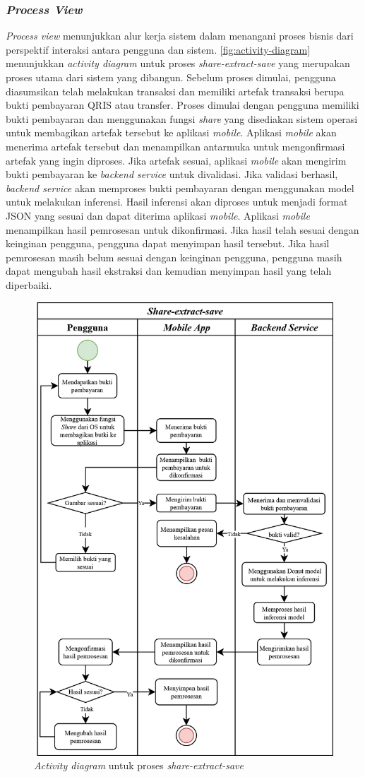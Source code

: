 \subsubsection{\emph{Process View}}
\label{subsubsec:process-view}
\emph{Process view} menunjukkan alur kerja sistem dalam menangani proses bisnis dari perspektif interaksi antara pengguna dan sistem. \autoref{fig:activity-diagram} menunjukkan \emph{activity diagram} untuk proses \emph{share-extract-save} yang merupakan proses utama dari sistem yang dibangun. Sebelum proses dimulai, pengguna diasumsikan telah melakukan transaksi dan memiliki artefak transaksi berupa bukti pembayaran QRIS atau transfer. Proses dimulai dengan pengguna memiliki bukti pembayaran dan menggunakan fungsi \emph{share} yang disediakan sistem operasi untuk membagikan artefak tersebut ke aplikasi \emph{mobile}. Aplikasi \emph{mobile} akan menerima artefak tersebut dan menampilkan antarmuka untuk mengonfirmasi artefak yang ingin diproses. Jika artefak sesuai, aplikasi \emph{mobile} akan mengirim bukti pembayaran ke \emph{backend service} untuk divalidasi. Jika validasi berhasil, \emph{backend service} akan memproses bukti pembayaran dengan menggunakan model \donut{} untuk melakukan inferensi. Hasil inferensi akan diproses untuk menjadi format JSON yang sesuai dan dapat diterima aplikasi \emph{mobile}. Aplikasi \emph{mobile} menampilkan hasil pemrosesan untuk dikonfirmasi. Jika hasil telah sesuai dengan keinginan pengguna, pengguna dapat menyimpan hasil tersebut. Jika hasil pemrosesan masih belum sesuai dengan keinginan pengguna, pengguna masih dapat mengubah hasil ekstraksi dan kemudian menyimpan hasil yang telah diperbaiki.

\begin{figure}[htbp]
    \centering
    \includegraphics[width=.90625\textwidth]{images/activity-diagram.png}
    \caption{\emph{Activity diagram} untuk proses \emph{share-extract-save}}
    \label{fig:activity-diagram}
\end{figure}